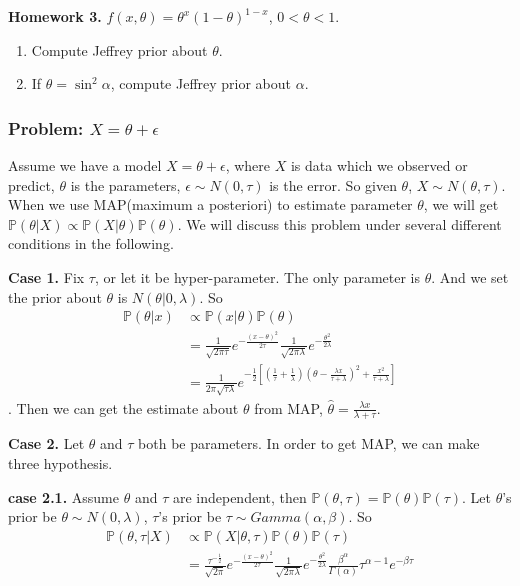 \documentclass[11pt]{article}
\def\BP{{\bf P}}
\def\BP{{\mathbb P}}
\begin{document}
\textbf{Homework 3.} $f(x, \theta) = \theta^x(1-\theta)^{1-x}$, $0 < \theta < 1$.
\begin{enumerate}
\item Compute Jeffrey prior about $\theta$.
\item If $\theta = \sin^2 \alpha$, compute Jeffrey prior about $\alpha$.
\end{enumerate}
 
\subsubsection{Problem: $X = \theta + \epsilon$}
Assume we have a model $X = \theta + \epsilon$, where $X$ is data which we observed or predict, $\theta$ is the parameters, $\epsilon \sim N(0, \tau)$ is the error. So given $\theta$, $X \sim N(\theta, \tau)$. When we use MAP(maximum a posteriori) to estimate parameter $\theta$, we will get $\BP(\theta | X) \propto \BP(X | \theta)\BP(\theta)$. 
We will discuss this problem under several different conditions in the following.

\textbf{Case 1.} Fix $\tau$, or let it be hyper-parameter. The only parameter is $\theta$. And we set the prior about $\theta$ is $N(\theta | 0, \lambda)$. So
\[\begin{split} 
\BP(\theta | x) &\propto \BP(x | \theta) \BP(\theta) \\
&= \frac{1}{\sqrt{2\pi\tau}} e^{-\frac{(x - \theta)^2}{2\tau}} 
\frac{1}{\sqrt{2\pi\lambda}} e^{-\frac{\theta^2}{2\lambda}} \\
&= \frac{1}{2\pi \sqrt{\tau\lambda}} e^{-\frac{1}{2} [(\frac{1}{\tau} + \frac{1}{\lambda})( \theta - \frac{\lambda x}{\tau + \lambda} )^2 + \frac{x^2}{\tau + \lambda}] }
\end{split}\].
Then we can get the estimate about $\theta$ from MAP, $\hat{\theta} = \frac{\lambda x}{\lambda + \tau}$.

\textbf{Case 2.} Let $\theta$ and $\tau$ both be parameters. In order to get MAP, we can make three hypothesis.

\textbf{case 2.1.} Assume $\theta$ and $\tau$ are independent, then 
$\BP(\theta, \tau) = \BP(\theta)\BP(\tau)$. Let $\theta$'s prior be $\theta \sim N(0, \lambda)$, $\tau$'s prior be $\tau \sim Gamma(\alpha, \beta)$. So
\[\begin{split}
\BP(\theta, \tau | X) &\propto \BP(X | \theta, \tau) \BP(\theta) \BP(\tau) \\
&= \frac{\tau^{-\frac{1}{2}}}{\sqrt{2\pi}} e^{-\frac{(x - \theta)^2}{2\tau}}
\frac{1}{\sqrt{2\pi\lambda}} e^{-\frac{\theta^2}{2\lambda}} 
\frac{\beta^\alpha}{\Gamma(\alpha)} \tau^{\alpha-1} e^{-\beta\tau}
\end{split}\] 
\end{document}
